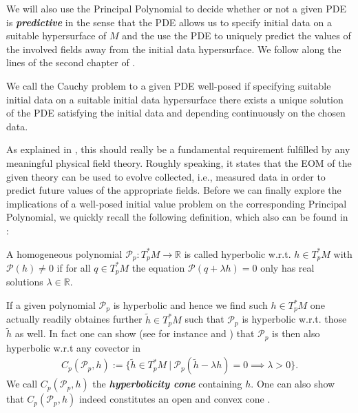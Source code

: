 We will also use the Principal Polynomial to decide whether or not a given PDE is \textit{\textbf{predictive}} in the sense that the PDE allows us to specify initial data on a suitable hypersurface of $M$ and the use the PDE to uniquely predict the values of the involved fields away from the initial data hypersurface. We follow along the lines of the second chapter of \cite{Rivera}.
\begin{definition}
We call the Cauchy problem to a given PDE well-posed if specifying suitable initial data on a suitable initial data hypersurface there exists a unique solution of the PDE satisfying the initial data and depending continuously on the chosen data.  
\end{definition}
As explained in \cite{Rivera}, this should really be a fundamental requirement fulfilled by any meaningful physical field theory. Roughly speaking, it states that the EOM of the given theory can be used to evolve collected, i.e., measured data in order to predict future values of the appropriate fields.
Before we can finally explore the implications of a well-posed initial value problem on the corresponding Principal Polynomial, we quickly recall the following definition, which also can be found in \cite{Rivera}:
\begin{definition}
A homogeneous polynomial $\mathcal{P}_p : T_p^{\ast}M \rightarrow \mathbb{R}$ is called hyperbolic w.r.t. $h\in T_p^{\ast}M$ with $\mathcal{P}(h) \neq 0$ if for all $q\in T_p^{\ast}M$ the equation $\mathcal{P}(q + \lambda h)=0$ only has real solutions $\lambda \in \mathbb{R}$.
\end{definition}
\begin{remark}
If a given polynomial $\mathcal{P}_p$ is hyperbolic and hence we find such $h\in T^{\ast}_pM$ one actually readily obtaines further $\tilde{h}\in T^{\ast}_pM$ such that $\mathcal{P}_p$ is hyperbolic w.r.t. those $\tilde{h}$ as well. In fact one can show (see for instance \cite{Rivera} and \cite{10.2307/24900665}) that $\mathcal{P}_p$ is then also hyperbolic w.r.t any covector in 
\begin{align}
    C_p(\mathcal{P}_p,h) := \{ \tilde{h} \in T_p^{\ast}M \ \vert \ \mathcal{P}_p(\tilde{h}- \lambda h) = 0 \implies \lambda > 0\}.
\end{align}
We call $C_p(\mathcal{P}_p,h)$ the \textbf{\textit{hyperbolicity cone}} containing $h$. One can also show that $C_p(\mathcal{P}_p,h)$ indeed constitutes an open and convex cone \cite{10.2307/24900665}.
\end{remark}
